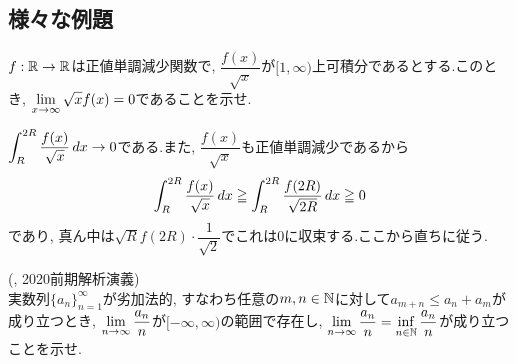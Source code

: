 























































\clearpage
\subsection{様々な例題}
\begin{egprob}
$f:\mathbb{R}\to \mathbb{R}$は正値単調減少関数で, $\dfrac{f(x)}{\sqrt{x}}$が$[1,\infty)$上可積分であるとする.このとき, $\displaystyle\lim_{x\to \infty} \sqrt{x} f(x) = 0$であることを示せ.
\end{egprob}
\begin{egans}
$\displaystyle\int_{R}^{2R} \dfrac{f(x)}{\sqrt{x}}\, dx \to 0$である.また, $\dfrac{f(x)}{\sqrt{x}}$も正値単調減少であるから
\[\displaystyle\int_{R}^{2R} \dfrac{f(x)}{\sqrt{x}}\, dx \geqq \displaystyle\int_{R}^{2R} \dfrac{f(2R)}{\sqrt{2R}} \, dx \geqq 0\]
であり, 真ん中は$\sqrt{R}f(2R)\cdot \dfrac{1}{\sqrt{2}}$でこれは0に収束する.ここから直ちに従う.
\end{egans}

\begin{egprob} (, 2020前期解析演義)\\
実数列$\{ a_n \}_{n=1}^{\infty}$が劣加法的, すなわち任意の$m,n\in \mathbb{N}$に対して$a_{m+n}\leq a_{n} + a_m$が成り立つとき, $\displaystyle\lim_{n\to \infty}\dfrac{a_n}{n}$が$[-\infty, \infty)$の範囲で存在し, $\displaystyle\lim_{n\to \infty} \dfrac{a_n}{n} = \displaystyle\inf_{n\in\mathbb{N}} \dfrac{a_n}{n}$が成り立つことを示せ.
\end{egprob}

